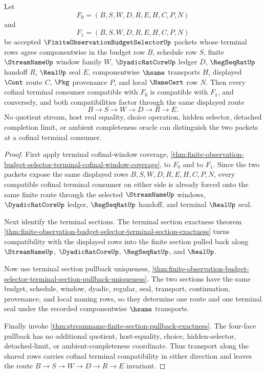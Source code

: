 \begin{theorem}
\label{thm:finite-observation-budget-selector-terminal-cofinal-window-transport-invariance}
Let
$$
F_0=(B,S,W,D,R,E,H,C,P,N)
$$
and
$$
F_1=(B,S,W,D,R,E,H,C,P,N)
$$
be accepted $\FiniteObservationBudgetSelectorUp$ packets whose terminal rows agree componentwise in the budget row $B$, schedule row $S$, finite $\StreamNameUp$ window family $W$, $\DyadicRatCoreUp$ ledger $D$, $\RegSeqRatUp$ handoff $R$, $\RealUp$ seal $E$, componentwise $\hsame$ transports $H$, displayed $\Cont$ route $C$, $\Pkg$ provenance $P$, and local $\NameCert$ row $N$. Then every cofinal terminal consumer compatible with $F_0$ is compatible with $F_1$, and conversely, and both compatibilities factor through the same displayed route
$$
B \to S \to W \to D \to R \to E.
$$
No quotient stream, host real equality, choice operation, hidden selector, detached completion limit, or ambient completeness oracle can distinguish the two packets at a cofinal terminal consumer.
\end{theorem}
\begin{proof}
First apply terminal cofinal-window coverage, \autoref{thm:finite-observation-budget-selector-terminal-cofinal-window-coverage}, to $F_0$ and to $F_1$. Since the two packets expose the same displayed rows $B,S,W,D,R,E,H,C,P,N$, every compatible cofinal terminal consumer on either side is already forced onto the same finite route through the selected $\StreamNameUp$ windows, $\DyadicRatCoreUp$ ledger, $\RegSeqRatUp$ handoff, and terminal $\RealUp$ seal.

Next identify the terminal sections. The terminal section exactness theorem \autoref{thm:finite-observation-budget-selector-terminal-section-exactness} turns compatibility with the displayed rows into the finite section pulled back along $\StreamNameUp$, $\DyadicRatCoreUp$, $\RegSeqRatUp$, and $\RealUp$.

Now use terminal section pullback uniqueness, \autoref{thm:finite-observation-budget-selector-terminal-section-pullback-uniqueness}. The two sections have the same budget, schedule, window, dyadic, regular, seal, transport, continuation, provenance, and local naming rows, so they determine one route and one terminal seal under the recorded componentwise $\hsame$ transports.

Finally invoke \autoref{thm:streamname-finite-section-pullback-exactness}. The four-face pullback has no additional quotient, host-equality, choice, hidden-selector, detached-limit, or ambient-completeness coordinate. Thus transport along the shared rows carries cofinal terminal compatibility in either direction and leaves the route $B \to S \to W \to D \to R \to E$ invariant.
\end{proof}

